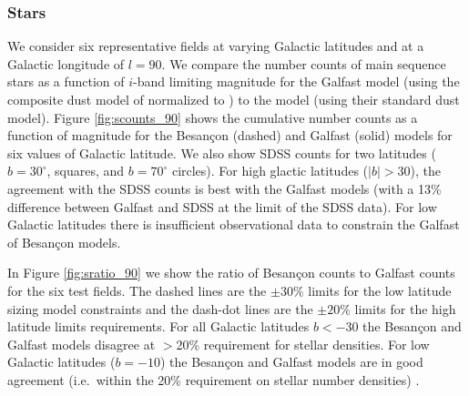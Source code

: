 \documentclass[11pt]{article}
\begin{document}
\subsubsection{Stars}
We consider six representative fields at varying Galactic latitudes
and at a Galactic longitude of $l=90$.  We compare the number counts
of main sequence stars as a function of $i$-band limiting magnitude
for the Galfast model \citep{juric} (using the composite dust model of
\citet{amores05} normalized to \citet{schlegel98}) to the
\citet{besancon} model (using their standard dust model).  Figure
\ref{fig:scounts_90} shows the cumulative number counts as a function
of magnitude for the Besan\c{c}on (dashed) and Galfast (solid) models
for six values of Galactic latitude.  We also show SDSS counts for two
latitudes ($b=30^{\circ}$, squares, and $b=70^{\circ}$ circles).  For
high glactic latitudes ($|b| >30$), the agreement with the SDSS counts
is best with the Galfast models (with a 13\% difference between
Galfast and SDSS at the limit of the SDSS data). For low Galactic
latitudes there is insufficient observational data to constrain the
Galfast of Besan\c{c}on models.

In Figure \ref{fig:sratio_90} we show the ratio of Besan\c{c}on counts
to Galfast counts for the six test fields.  The dashed lines are the
$\pm30\%$ limits for the low latitude sizing model constraints and the
dash-dot lines are the $\pm20\%$ limits for the high latitude limits
requirements.  For all Galactic latitudes $b<-30$ the Besan\c{c}on and
Galfast models disagree at $>$20\% requirement for stellar
densities. For low Galactic latitudes ($b=-10$) the Besan\c{c}on and
Galfast models are in good agreement (i.e.\ within the 20\%
requirement on stellar number densities) .


\end{document}
